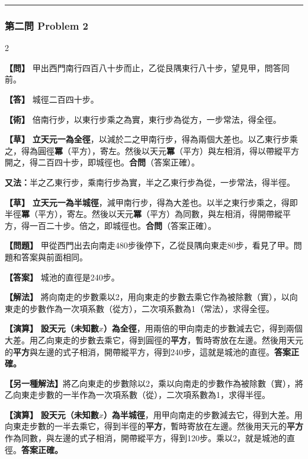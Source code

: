 \documentclass[11pt,a4paper]{article}
\newcommand{\wen}[1]{\par\noindent\textbf{\color{problemcolor}【問】} #1\par}
\newcommand{\da}[1]{\par\noindent\textbf{\color{problemcolor}【答】} #1\par}
\newcommand{\shu}[1]{\par\noindent\textbf{\color{problemcolor}【術】} #1\par}
\newcommand{\cao}[1]{\par\noindent\textbf{\color{problemcolor}【草】} #1\par}
\newcommand{\wenm}[1]{\par\noindent\textbf{\color{problemcolor}【問題】} #1\par}
\newcommand{\dam}[1]{\par\noindent\textbf{\color{problemcolor}【答案】} #1\par}
\newcommand{\shum}[1]{\par\noindent\textbf{\color{problemcolor}【解法】} #1\par}
\newcommand{\caom}[1]{\par\noindent\textbf{\color{problemcolor}【演算】} #1\par}
\begin{document}
\vspace{0.5cm}
\noindent\textcolor{rulecolor}{\rule{\textwidth}{0.4pt}}

\subsubsection*{第二問 \quad Problem 2}

\begin{paracol}{2}
\wen{甲出西門南行四百八十步而止，乙從艮隅東行八十步，望見甲，問答同前。}

\da{城徑二百四十步。}

\shu{倍南行步，以東行步乘之為實，東行步為從方，一步常法，得全徑。}

\cao{\textbf{立天元一為全徑}，以減於二之甲南行步，得為兩個大差也。以乙東行步乘之，得為圓徑\textbf{冪}（平方），寄左。然後以天元\textbf{冪}（平方）與左相消，得以帶縱平方開之，得二百四十步，即城徑也。\textbf{合問}（答案正確）。}

\vspace{0.2cm}
\noindent\textbf{又法：}半之乙東行步，乘南行步為實，半之乙東行步為從，一步常法，得半徑。

\cao{\textbf{立天元一為半城徑}，減甲南行步，得為大差也。以半之東行步乘之，得即半徑\textbf{冪}（平方），寄左。然後以天元\textbf{冪}（平方）為同數，與左相消，得開帶縱平方，得一百二十步。倍之，即城徑也。\textbf{合問}（答案正確）。}

\switchcolumn
\wenm{甲從西門出去向南走480步後停下，乙從艮隅向東走80步，看見了甲。問題和答案與前面相同。}

\dam{城池的直徑是240步。}

\shum{將向南走的步數乘以2，用向東走的步數去乘它作為被除數（實），以向東走的步數作為一次項系數（從方），二次項系數為1（常法），求得全徑。}

\caom{\textbf{設天元（未知數$x$）為全徑}，用兩倍的甲向南走的步數減去它，得到兩個大差。用乙向東走的步數去乘它，得到圓徑的\textbf{平方}，暫時寄放在左邊。然後用天元的\textbf{平方}與左邊的式子相消，開帶縱平方，得到240步，這就是城池的直徑。\textbf{答案正確。}}

\vspace{0.2cm}
\noindent\textbf{【另一種解法】}將乙向東走的步數除以2，乘以向南走的步數作為被除數（實），將乙向東走步數的一半作為一次項系數（從），二次項系數為1，求得半徑。

\caom{\textbf{設天元（未知數$x$）為半城徑}，用甲向南走的步數減去它，得到大差。用向東走步數的一半去乘它，得到半徑的\textbf{平方}，暫時寄放在左邊。然後用天元的\textbf{平方}作為同數，與左邊的式子相消，開帶縱平方，得到120步。乘以2，就是城池的直徑。\textbf{答案正確。}}
\end{paracol}
\end{document}
